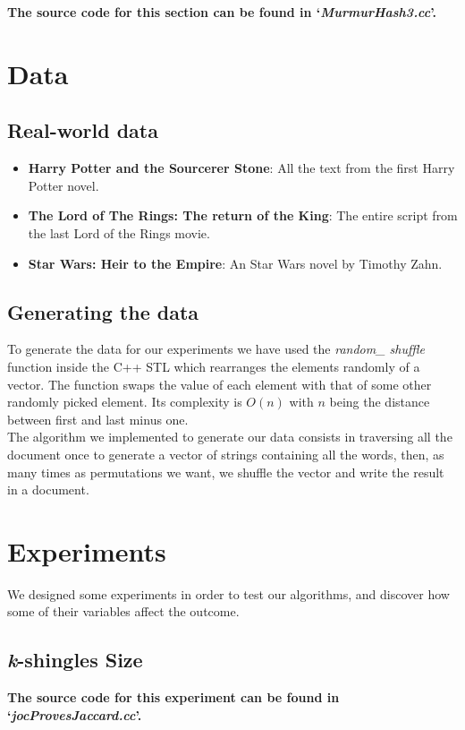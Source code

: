 \documentclass[12pt]{article}
\begin{document}
\textbf{The source code for this section can be found in `\textit{MurmurHash3.cc}'.}
\bigskip

\section{Data} %

\subsection{Real-world data}
\begin{itemize}
\item \textbf{Harry Potter and the Sourcerer Stone}: All the text from the first Harry Potter novel.
\item \textbf{The Lord of The Rings: The return of the King}: The entire script from the last Lord of the Rings movie.
\item \textbf{Star Wars: Heir to the Empire}:  An Star Wars novel by Timothy Zahn. 
\end{itemize}

\subsection{Generating the data} \label{generatingData}

To generate the data for our experiments we have used the \textit{random\_ shuffle} function inside the C++ STL which rearranges the elements randomly of a vector. The function swaps the value of each element with that of some other randomly picked element. Its complexity is $O(n)$ with $n$ being  the distance between first and last minus one.\\

The algorithm we implemented to generate our data consists in traversing all the document once to generate a vector of strings containing all the words, then, as many times as permutations we want, we shuffle the vector and write the result in a document. \\

\section{Experiments}
We designed some experiments in order to test our algorithms, and discover how some of their variables affect the outcome.

\subsection{\textit{k}-shingles Size}
\textbf{The source code for this experiment can be found in `\textit{jocProvesJaccard.cc}'.}
\bigskip
\end{document}
